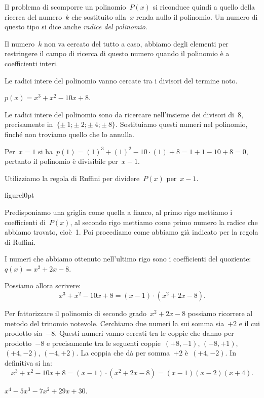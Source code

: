 Il problema di scomporre un polinomio~$P(x)$ si riconduce quindi a quello
della ricerca del numero~$k$ che sostituito alla~$x$ renda nullo il
polinomio. Un numero di questo tipo si dice anche \emph{radice del polinomio}.

Il numero~$k$ non va cercato del tutto a caso, abbiamo degli elementi per
restringere il campo di ricerca di questo numero quando il polinomio
è a coefficienti interi.

\osservazione Le radici intere del polinomio vanno cercate tra i divisori del 
termine noto.

 \begin{esempio}
 $p(x)=x^{3}+x^{2}-10x+8$.
 \end{esempio}
Le radici intere del polinomio sono da ricercare
nell'insieme dei divisori di~8, precisamente in~$\{\pm~1;\pm~2;\pm~4;\pm~8\}$.
Sostituiamo questi numeri nel polinomio,
finché non troviamo quello che lo annulla.

Per~$x=1$ si ha~$p(1)=(1)^{3}+(1)^{2}-10\cdot (1)+8=1+1-10+8=0$,
pertanto il polinomio è divisibile per~$x-1$.

Utilizziamo la regola di Ruffini per dividere~$P(x)$ per~$x-1$.

\begin{wrapfloat}{figure}{l}{0pt}
 
\end{wrapfloat}

Predisponiamo una griglia come quella a fianco, al primo rigo mettiamo i
coefficienti di~$P(x)$, al secondo rigo mettiamo come primo numero la
radice che abbiamo trovato, cioè~1. Poi procediamo come abbiamo già
indicato per la regola di Ruffini.

I numeri che abbiamo ottenuto nell'ultimo rigo sono i
coefficienti del quoziente: $q(x)=x^{2}+2x-8$.

Possiamo allora scrivere:
\[x^{3}+x^{2}-10x+8=(x-1)\cdot (x^{2}+2x-8).\]

Per fattorizzare il polinomio di secondo grado~$x^{2}+2x-8$ possiamo
ricorrere al metodo del trinomio notevole. Cerchiamo due numeri la sui
somma sia~$+2$ e il cui prodotto sia~$-8$. Questi numeri vanno cercati tra
le coppie che danno per prodotto~$-8$ e precisamente tra le seguenti
coppie~$(+8, -1)$, $(-8, +1)$, $(+4, -2)$, $(-4, +2)$. La coppia che dà per
somma~$+2$ è~$(+4, -2)$. In definitiva si ha:
\[x^{3}+x^{2}-10x+8=(x-1)\cdot (x^{2}+2x-8)=(x-1)(x-2)(x+4).\]


 \begin{esempio}
$x^{4}-5x^{3}-7x^{2}+29x+30$.
\end{esempio}

